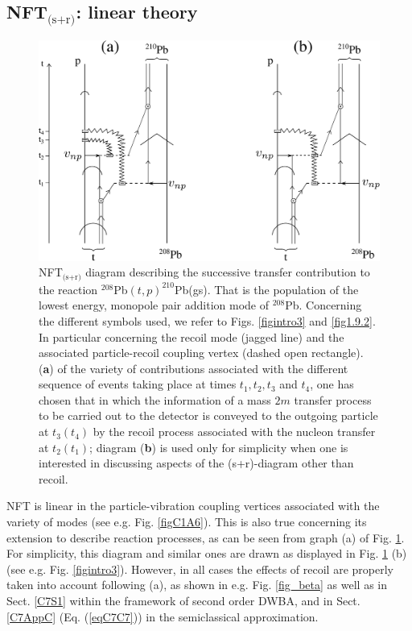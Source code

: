 \begin{subappendices}
\section{NFT$_{\text{(s+r)}}$: linear theory}\label{App1C3}
\begin{figure}
\centerline {
\includegraphics*[width=15cm]{introduccion/figs/fig1_C_2}
}
\caption{ NFT$_{\text{(s+r)}}$ diagram describing the successive transfer contribution to the reaction $^{208}$Pb$(t,p)^{210}$Pb(gs). That is the population of the lowest energy, monopole pair addition mode of $^{208}$Pb. Concerning the different symbols used, we refer to Figs. \ref{figintro3} and \ref{fig1.9.2}. In particular concerning the recoil mode (jagged line) and the associated particle-recoil  coupling vertex (dashed open rectangle). (\textbf{a}) of the variety of contributions associated with the different sequence of events taking place  at times $t_1,t_2,t_3$ and $t_4$, one has chosen that in which the information of a mass $2m$ transfer process to be carried out to the detector is conveyed to the outgoing particle at $t_3(t_4)$ by the recoil process associated with the nucleon transfer at $t_2(t_1)$; diagram (\textbf{b}) is used only for simplicity when one is interested in discussing aspects of the (s+r)-diagram other than recoil.}
\label{fig1.C.2}
\end{figure}
NFT is linear in the  particle-vibration coupling vertices associated with the variety of modes (see e.g. Fig. \ref{figC1A6}).  This is also true concerning its extension to describe reaction processes, as can be seen from graph (a) of Fig. \ref{fig1.C.2}. For simplicity, this diagram and similar ones are drawn as displayed in Fig. \ref{fig1.C.2} (b) (see e.g. Fig. \ref{figintro3}). However, in all cases the effects of recoil are properly taken into account following (a), as shown in e.g. Fig. \ref{fig_beta} as well as in Sect. \ref{C7S1} within the framework of second order DWBA, and in Sect. \ref{C7AppC} (Eq. (\ref{eqC7C7})) in the semiclassical approximation.

\end{subappendices}
